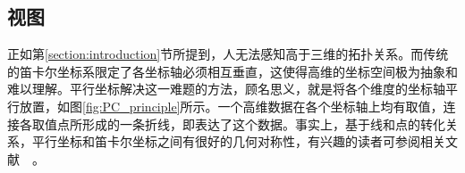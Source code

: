 \documentclass[12pt,twocolumn]{article}
\begin{document}
                                                                                                                                                                                                                                                                                                                                                                                                                                                                                                                                                                                                                                                                                                                                                                                                                                                                                                                                                                                                                                                                                                                                                                                                                                                                                                                                                                                                                                                  

\subsection{视图}
\label{subsection:designBasics}
正如第\ref{section:introduction}节所提到，人无法感知高于三维的拓扑关系。而传统的笛卡尔坐标系限定了各坐标轴必须相互垂直，这使得高维的坐标空间极为抽象和难以理解。平行坐标解决这一难题的方法，顾名思义，就是将各个维度的坐标轴平行放置，如图\ref{fig:PC_principle}所示。一个高维数据在各个坐标轴上均有取值，连接各取值点所形成的一条折线，即表达了这个数据。事实上，基于线和点的转化关系，平行坐标和笛卡尔坐标之间有很好的几何对称性，有兴趣的读者可参阅相关文献~\citep{inselberg1985plane}~\citep{inselberg2009parallel}。
\end{document}
